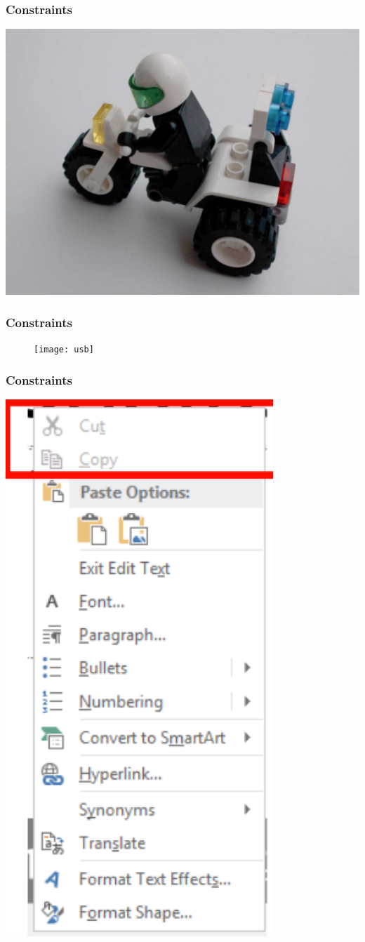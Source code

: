 \documentclass{beamer}
\begin{document}

\begin{frame}
\frametitle{Constraints}
\centering
\includegraphics[width=0.7\linewidth]{lego2}
\end{frame}

\begin{frame}
\frametitle{Constraints}
\centering
\begin{figure}
	\texttt{[image: usb]}
\end{figure}
\end{frame}

\begin{frame}
\frametitle{Constraints}
\centering
\includegraphics[width=0.3\linewidth]{constraint1}
\end{frame}
\end{document}
